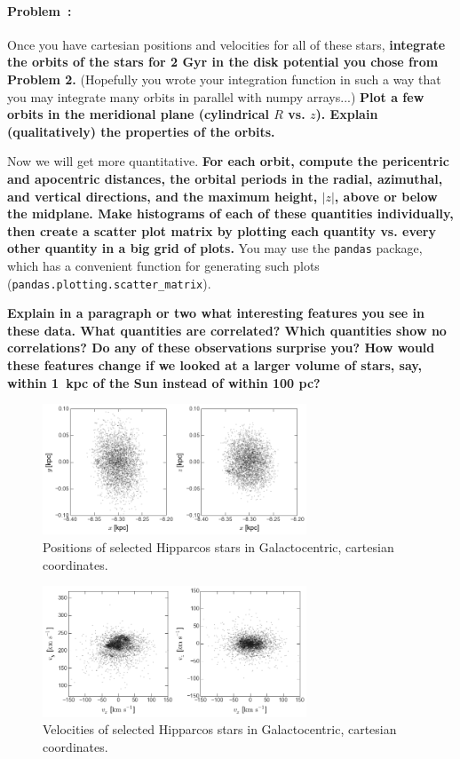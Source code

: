 \documentclass[12pt,twoside]{article}
\newcommand{\problemname}{Problem}
\newcounter{problem}
\newenvironment{problem}{\paragraph{\problemname~\theproblem:}\refstepcounter{problem}}{}
\begin{document}
\begin{problem}
Once you have cartesian positions and velocities for all of these stars, {\bf integrate the orbits of the stars for 2 Gyr in the disk potential you chose from Problem 2.} (Hopefully you wrote your integration function in such a way that you may integrate many orbits in parallel with numpy arrays...) {\bf Plot a few orbits in the meridional plane (cylindrical $R$ vs. $z$). Explain (qualitatively) the properties of the orbits.}

Now we will get more quantitative. {\bf For each orbit, compute the pericentric and apocentric distances, the orbital periods in the radial, azimuthal, and vertical directions, and the maximum height, $|z|$, above or below the midplane. Make histograms of each of these quantities individually, then create a scatter plot matrix by plotting each quantity vs. every other quantity in a big grid of plots.} You may use the \texttt{pandas} package, which has a convenient function for generating such plots (\texttt{pandas.plotting.scatter\_matrix}).

{\bf Explain in a paragraph or two what interesting features you see in these data. What quantities are correlated? Which quantities show no correlations? Do any of these observations surprise you? How would these features change if we looked at a larger volume of stars, say, within 1~kpc of the Sun instead of within 100 pc?}

\end{problem}

\begin{figure}[!h]
\begin{center}
\includegraphics[width=0.7\textwidth]{xyz.png}
\caption{ Positions of selected Hipparcos stars in Galactocentric, cartesian coordinates. }\label{fig:xyz}
\end{center}
\end{figure}

\begin{figure}[!h]
\begin{center}
\includegraphics[width=0.7\textwidth]{vxyz.png}
\caption{ Velocities of selected Hipparcos stars in Galactocentric, cartesian coordinates. }\label{fig:vxyz}
\end{center}
\end{figure}
\end{document}
